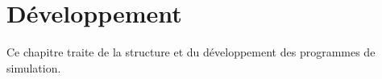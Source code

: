 \chapter{Développement}

Ce chapitre traite de la structure et du développement des programmes de simulation.




%
%
